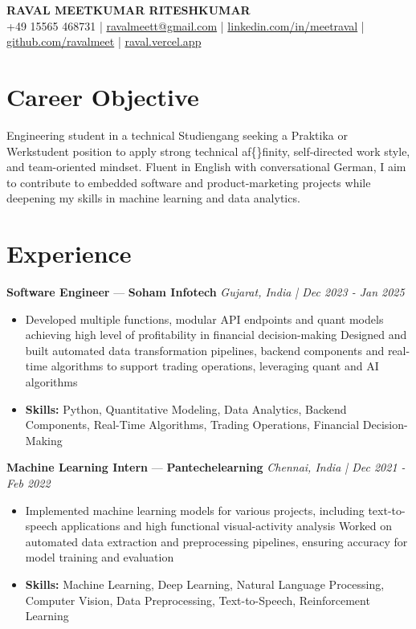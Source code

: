 \documentclass[a4paper,10pt]{article}
\begin{document}
\begin{center}
  {\Large\bfseries RAVAL MEETKUMAR RITESHKUMAR}\\[2pt]
  {\small +49 15565 468731 \;|\; \href{mailto:ravalmeett@gmail.com}{ravalmeett@gmail.com} \;|\; \href{https://www.linkedin.com/in/meetraval/}{linkedin.com/in/meetraval} \;|\; \href{https://github.com/ravalmeet}{github.com/ravalmeet} \;|\; \href{https://raval.vercel.app/}{raval.vercel.app}}
\end{center}
\vspace{-3pt}

\section*{Career Objective}
Engineering student in a technical Studiengang seeking a Praktika or Werkstudent position to apply strong technical af\{\}finity, self-directed work style, and team-oriented mindset. Fluent in English with conversational German, I aim to contribute to embedded software and product-marketing projects while deepening my skills in machine learning and data analytics.\par

\section*{Experience}
\textbf{Software Engineer} — \textbf{Soham Infotech} \hfill \textit{Gujarat, India \;|\; Dec 2023 - Jan 2025}\par
\vspace{1pt}
\begin{itemize}
  \item Developed multiple functions, modular API endpoints and quant models achieving high level of profitability in financial decision-making Designed and built automated data transformation pipelines, backend components and real-time algorithms to support trading operations, leveraging quant and AI algorithms
  \item \textbf{Skills:} Python, Quantitative Modeling, Data Analytics, Backend Components, Real-Time Algorithms, Trading Operations, Financial Decision-Making
\end{itemize}
\vspace{3pt}
\textbf{Machine Learning Intern} — \textbf{Pantechelearning} \hfill \textit{Chennai, India \;|\; Dec 2021 - Feb 2022}\par
\vspace{1pt}
\begin{itemize}
  \item Implemented machine learning models for various projects, including text-to-speech applications and high functional visual-activity analysis Worked on automated data extraction and preprocessing pipelines, ensuring accuracy for model training and evaluation
  \item \textbf{Skills:} Machine Learning, Deep Learning, Natural Language Processing, Computer Vision, Data Preprocessing, Text-to-Speech, Reinforcement Learning
\end{itemize}
\end{document}
